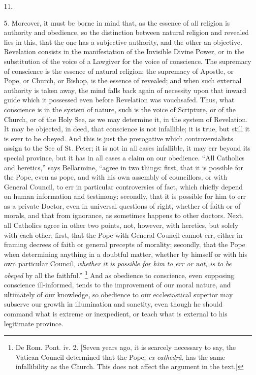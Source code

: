 11.

5. Moreover, it must be borne in mind that, as the
essence of all religion is authority and obedience, so
the distinction between natural religion and revealed
lies in this, that the one has a subjective authority,
and the other an objective. Revelation consists in the
manifestation of the Invisible Divine Power, or in the
substitution of the voice of a Lawgiver for the voice of
conscience. The supremacy of conscience is the essence of
natural religion; the supremacy of Apostle, or Pope, or
Church, or Bishop, is the essence of revealed; and when
such external authority is taken away, the mind falls
back again of necessity upon that inward guide which it
possessed even before Revelation was vouchsafed. Thus,
what conscience is in the system of nature, such is the
voice of Scripture, or of the Church, or of the Holy See,
as we may determine it, in the system of Revelation. It
may be objected, in deed, that conscience is not
infallible; it is true, but still it is ever to be
obeyed. And this is just the prerogative which
controversialists assign to the See of St. Peter; it is
not in all cases infallible, it may err beyond its
special province, but it has in all cases a claim on our
obedience. ``All Catholics and heretics,'' says
Bellarmine, ``agree in two things: first, that it is
possible for the Pope, even as pope, and with his own
assembly of councillors, or with General Council, to err
in particular controversies of fact, which chiefly depend
on human information and testimony; secondly, that it is
possible for him to err as a private Doctor, even in
universal questions of right, whether of faith or of
morals, and that from ignorance, as sometimes happens to
other doctors. Next, all Catholics agree in other two
points, not, however, with heretics, but solely with each
other: first, that the Pope with General Council cannot
err, either in framing decrees of faith or general
precepts of morality; secondly, that the Pope when
determining anything in a doubtful matter, whether by
himself or with his own particular Council, \emph{whether it
is possible for him to err or not, is to be obeyed} by
all the faithful.'' \footnote{De Rom. Pont. iv. 2. [Seven
years ago, it is scarcely necessary to say, the Vatican
Council determined that the Pope, \emph{ex cathedrâ}, has
the same infallibility as the Church. This does not
affect the argument in the text.]} And as obedience to
conscience, even supposing conscience ill-informed, tends
to the improvement of our moral nature, and ultimately of
our knowledge, so obedience to our ecclesiastical
superior may subserve our growth in illumination and
sanctity, even though he should command what is extreme
or inexpedient, or teach what is external to his
legitimate province.

